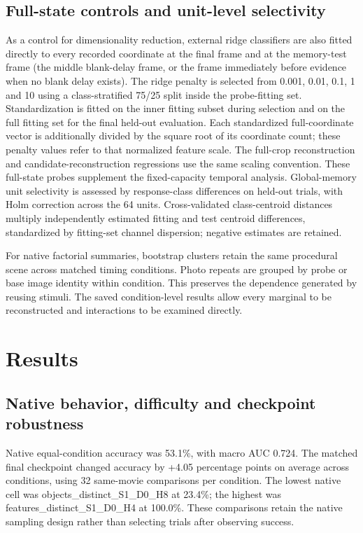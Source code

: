 \documentclass[11pt]{article}
\begin{document}
\subsection{Full-state controls and unit-level selectivity}
As a control for dimensionality reduction, external ridge classifiers are also fitted directly to every recorded coordinate at the final frame and at the memory-test frame (the middle blank-delay frame, or the frame immediately before evidence when no blank delay exists). The ridge penalty is selected from 0.001, 0.01, 0.1, 1 and 10 using a class-stratified 75/25 split inside the probe-fitting set. Standardization is fitted on the inner fitting subset during selection and on the full fitting set for the final held-out evaluation. Each standardized full-coordinate vector is additionally divided by the square root of its coordinate count; these penalty values refer to that normalized feature scale. The full-crop reconstruction and candidate-reconstruction regressions use the same scaling convention. These full-state probes supplement the fixed-capacity temporal analysis. Global-memory unit selectivity is assessed by response-class differences on held-out trials, with Holm correction across the 64 units. Cross-validated class-centroid distances multiply independently estimated fitting and test centroid differences, standardized by fitting-set channel dispersion; negative estimates are retained.

For native factorial summaries, bootstrap clusters retain the same procedural scene across matched timing conditions. Photo repeats are grouped by probe or base image identity within condition. This preserves the dependence generated by reusing stimuli. The saved condition-level results allow every marginal to be reconstructed and interactions to be examined directly.
\section{Results}
\subsection{Native behavior, difficulty and checkpoint robustness}
Native equal-condition accuracy was 53.1\%, with macro AUC 0.724. The matched final checkpoint changed accuracy by +4.05 percentage points on average across conditions, using 32 same-movie comparisons per condition. The lowest native cell was objects\_\allowbreak{}distinct\_\allowbreak{}S1\_\allowbreak{}D0\_\allowbreak{}H8 at 23.4\%; the highest was features\_\allowbreak{}distinct\_\allowbreak{}S1\_\allowbreak{}D0\_\allowbreak{}H4 at 100.0\%. These comparisons retain the native sampling design rather than selecting trials after observing success.
\end{document}
